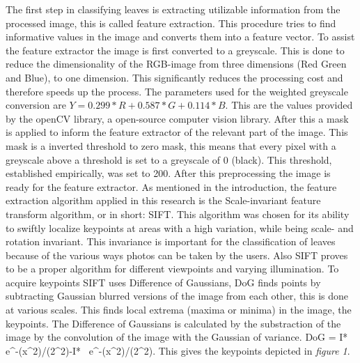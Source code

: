 \documentclass{article}
\begin{document}
The first step in classifying leaves is extracting utilizable information from the processed image, this is called feature extraction. This procedure tries to find informative values in the image and converts them into a feature vector. To assist the feature extractor the image is first converted to a greyscale. This is done to reduce the dimensionality of the RGB-image from three dimensions (Red Green and Blue), to one dimension. This significantly reduces the processing cost and therefore speeds up the process. The parameters used for the weighted greyscale conversion are $Y = 0.299 * R + 0.587 * G+0.114 * B$. This are the values provided by the openCV library, a open-source computer vision library. After this a mask is applied to inform the feature extractor of the relevant part of the image. This mask is a inverted threshold to zero mask, this means that every pixel with a greyscale above a threshold is set to a greyscale of 0 (black). This threshold, established empirically, was set to 200. After this preprocessing the image is ready for the feature extractor. As mentioned in the introduction, the feature extraction algorithm applied in this research is the Scale-invariant feature transform algorithm, or in short: SIFT. This algorithm was chosen for its ability to swiftly localize keypoints at areas with a high variation, while being scale- and rotation invariant. This invariance is important for the classification of leaves because of the various ways photos can be taken by the users. Also SIFT proves to be a proper algorithm for different viewpoints and varying illumination. To acquire keypoints SIFT uses Difference of Gaussians, DoG finds points by subtracting Gaussian blurred versions of the image from each other, this is done at various scales. This finds local extrema (maxima or minima) in the image, the keypoints. The Difference of Gaussians is calculated by the substraction of the image by the convolution of the image with the Gaussian of variance. 
\delta DoG 
=
I* \, e^{-(x^2)/(2\sigma^2)}-I* \, e^{-(x^2)/(2\sigma^2)}. 
This gives the keypoints depicted in \textit{figure 1}. 
\end{document}
